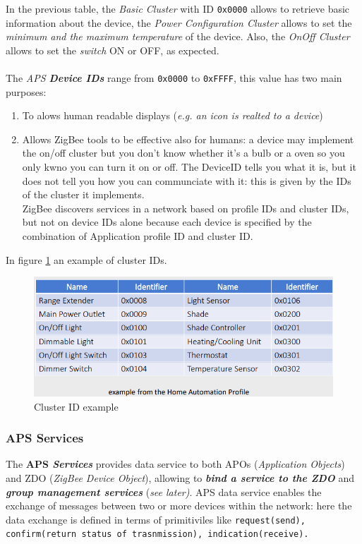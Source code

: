\documentclass[10pt,a4paper]{report}
\theoremstyle{definition}
\begin{document}
In the previous table, the \textit{Basic Cluster} with ID \texttt{0x0000} allows to retrieve basic information about the device, the \textit{Power Configuration Cluster} allows to set the \textit{minimum and the maximum temperature} of the device. Also, the \textit{OnOff Cluster} allows to set the \textit{switch} ON or OFF, as expected.\\\\
The \textit{APS \textbf{Device IDs}} range from \texttt{0x0000} to \texttt{0xFFFF}, this value has two main purposes:
\begin{enumerate}
	\item 
	To alows human readable displays (\textit{e.g. an icon is realted to a device})
	\item 
	Allows ZigBee tools to be effective also for humans: a device may implement the on/off cluster but you don't know whether it's a bulb or a oven so you only kwno you can turn it on or off. The DeviceID tells you what it is, but it does not tell you how you can communciate with it: this is given by the IDs of the cluster it implements.\\
	ZigBee discovers services in a network based on profile IDs and cluster IDs, but not on device IDs alone because each device is specified by the combination of Application profile ID and cluster ID.
	
\end{enumerate}
In figure \ref{cluster-IDs} an example of cluster IDs.
\begin{figure}[h]
	\centering\includegraphics[scale=0.50]{images/Pasted image 20230311161838.png}
	\caption{Cluster ID example}
	\label{cluster-IDs}
\end{figure}
\subsubsection{APS Services}
The \textbf{APS \textit{\textbf{Services}}} provides data service to both APOs (\textit{Application Objects}) and ZDO (\textit{ZigBee Device Object}), allowing to \textit{\textbf{bind a service to the ZDO}} and \textit{\textbf{group management services}} (\textit{see later)}. APS data service enables the exchange of messages between two or more devices within the network: here the data exchange is defined in terms of primitiviles like \texttt{request(send), confirm(return status of trasnmission), indication(receive). }
\end{document}
